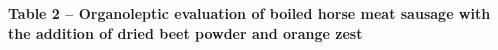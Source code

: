 {\bfseries Table 2 -- Organoleptic evaluation of boiled horse meat sausage with the addition of dried beet powder and orange zest}

